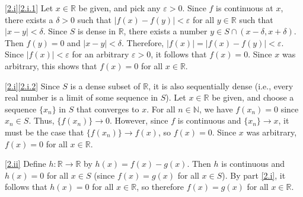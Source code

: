 \documentclass[a4paper,11pt]{ltjsarticle} %
\begin{document}

\begin{solution}
\ref{2.i}\ref{2.i.1}
Let $x \in \mathbb R$ be given, and pick any $\varepsilon > 0$.
Since $f$ is continuous at $x$, there exists a $\delta > 0$ such that
$|f(x) - f(y)| < \varepsilon$ for all $y \in \mathbb R$ such that
$|x - y| < \delta$.
Since $S$ is dense in $\mathbb R$, there exists a number
$y \in S \cap (x - \delta, x + \delta)$.
Then $f(y) = 0$ and $|x - y| < \delta$.
Therefore, $|f(x)| = |f(x) - f(y)| < \varepsilon$.
Since $|f(x)| < \varepsilon$ for an arbitrary $\varepsilon > 0$, it follows that
$f(x) = 0$.
Since $x$ was arbitrary, this shows that $f(x) = 0$ for all $x \in \mathbb R$.

\ref{2.i}\ref{2.i.2}
Since $S$ is a dense subset of $\mathbb R$, it is also sequentially dense (i.e.,
every real number is a limit of some sequence in $S$).
Let $x \in \mathbb R$ be given, and choose a sequence $\{x_n\}$ in $S$ that
converges to $x$.
For all $n \in \mathbb N$, we have $f(x_n) = 0$ since $x_n \in S$.
Thus, $\{f(x_n)\} \to 0$.
However, since $f$ is continuous and $\{x_n\} \to x$, it must be the case that
$\{f(x_n)\} \to f(x)$, so $f(x) = 0$.
Since $x$ was arbitrary, $f(x) = 0$ for all $x \in \mathbb R$.

\ref{2.ii}
Define $h : \mathbb R \to \mathbb R$ by $h(x) = f(x) - g(x)$.
Then $h$ is continuous and $h(x) = 0$ for all $x \in S$ (since $f(x) = g(x)$ for
all $x \in S$).
By part \ref{2.i}, it follows that $h(x) = 0$ for all $x \in \mathbb R$, so
therefore $f(x) = g(x)$ for all $x \in \mathbb R$.
\end{solution}
\end{document}
